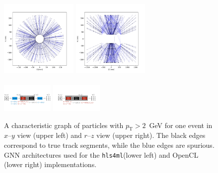 \documentclass{article}
\newcommand{\hlsfml}{\texttt{hls4ml}\xspace}
\newcommand{\pt}{\ensuremath{p_{\mathrm{T}}}\xspace}
\begin{document}
\begin{figure}[t]
    \centering
    \includegraphics[width=0.33\textwidth,clip=true,viewport = 0 10 392 382]{figures/event000001000_section0_xy.pdf}
    \includegraphics[width=0.33\textwidth,clip=true,viewport = 0 10 392 382]{figures/event000001000_section0_rz.pdf}\\~\\
    \includegraphics[height=1.4cm,clip=true,viewport = 0 270 1920 710]{figures/hls4ml_GNN.pdf}
    \includegraphics[height=1.4cm,clip=true,viewport = 150 270 1770 710]{figures/OpenCL_GNN.pdf}
    \caption{
    A characteristic graph of particles with $\pt>2$~GeV for one event in $x$--$y$ view (upper left) and $r$--$z$ view (upper right).
    The black edges correspond to true track segments, while the blue edges are spurious.
    GNN architectures used for the \hlsfml (lower left) and OpenCL (lower right) implementations.}
    \label{fig:graphs}
\end{figure}
\end{document}
